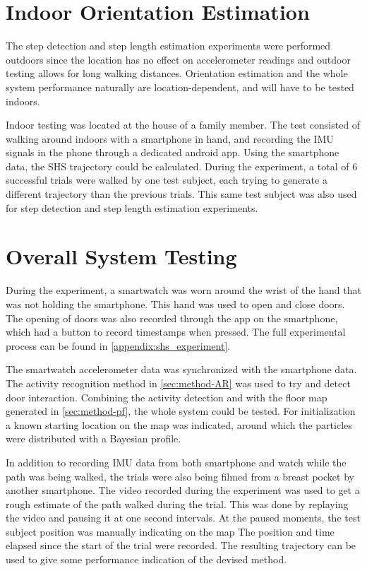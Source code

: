 \section{Indoor Orientation Estimation}

The step detection and step length estimation experiments were performed outdoors since the location has no effect on accelerometer readings and outdoor testing allows for long walking distances. Orientation estimation and the whole system performance naturally are location-dependent, and will have to be tested indoors. \par

Indoor testing was located at the house of a family member. The test consisted of walking around indoors with a smartphone in hand, and recording the IMU signals in the phone through a dedicated android app. Using the smartphone data, the SHS trajectory could be calculated. During the experiment, a total of 6 successful trials were walked by one test subject, each trying to generate a different trajectory than the previous trials. This same test subject was also used for step detection and step length estimation experiments.

\section{Overall System Testing}

During the experiment, a smartwatch was worn around the wrist of the hand that was not holding the smartphone. This hand was used to open and close doors. The opening of doors was also recorded through the app on the smartphone, which had a button to record timestamps when pressed. The full experimental process can be found in \cref{appendix:shs_experiment}. \par

The smartwatch accelerometer data was synchronized with the smartphone data. The activity recognition method in \cref{sec:method-AR} was used to try and detect door interaction. Combining the activity detection and  with the floor map generated in \cref{sec:method-pf}, the whole system could be tested. For initialization a known starting location on the map was indicated, around which the particles were distributed with a Bayesian profile.  \par 

In addition to recording IMU data from both smartphone and watch while the path was being walked, the trials were also being filmed from a breast pocket by another smartphone. The video recorded during the experiment was used to get a rough estimate of the path walked during the trial. This was done by replaying the video and pausing it at one second intervals. At the paused moments, the test subject position was manually indicating on the map The position and time elapsed since the start of the trial were recorded. The resulting trajectory can be used to give some performance indication of the devised method. \par 

